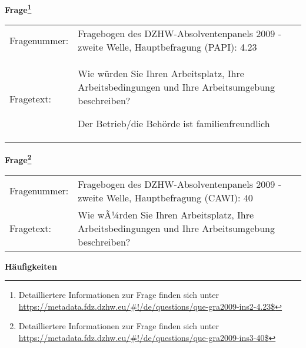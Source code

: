 				\vspace*{0.5cm}
                \noindent\textbf{Frage\footnote{Detailliertere Informationen zur Frage finden sich unter
		              \url{https://metadata.fdz.dzhw.eu/\#!/de/questions/que-gra2009-ins2-4.23$}}}\\
				\begin{tabularx}{\hsize}{@{}lX}
					Fragenummer: &
					  Fragebogen des DZHW-Absolventenpanels 2009 - zweite Welle, Hauptbefragung (PAPI):
					  4.23
 \\
					Fragetext: & Wie würden Sie Ihren Arbeitsplatz, Ihre Arbeitsbedingungen und Ihre Arbeitsumgebung beschreiben?\par  Der Betrieb/die Behörde ist familienfreundlich \\
				\end{tabularx}
				\vspace*{0.5cm}
                \noindent\textbf{Frage\footnote{Detailliertere Informationen zur Frage finden sich unter
		              \url{https://metadata.fdz.dzhw.eu/\#!/de/questions/que-gra2009-ins3-40$}}}\\
				\begin{tabularx}{\hsize}{@{}lX}
					Fragenummer: &
					  Fragebogen des DZHW-Absolventenpanels 2009 - zweite Welle, Hauptbefragung (CAWI):
					  40
 \\
					Fragetext: & Wie wÃ¼rden Sie Ihren Arbeitsplatz, Ihre Arbeitsbedingungen und Ihre Arbeitsumgebung beschreiben? \\
				\end{tabularx}





        		\vspace*{0.5cm}
                \noindent\textbf{Häufigkeiten}

